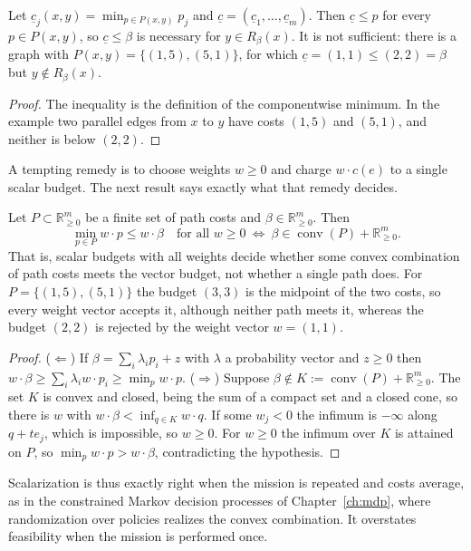 \begin{newresult}\label{prop:joint}
Let $\underline c_j(x,y)=\min_{p\in P(x,y)}p_j$ and $\underline c=(\underline c_1,\dots,\underline c_m)$. Then $\underline c\le p$ for every $p\in P(x,y)$, so $\underline c\le\beta$ is necessary for $y\in R_\beta(x)$. It is not sufficient: there is a graph with $P(x,y)=\{(1,5),(5,1)\}$, for which $\underline c=(1,1)\le(2,2)=\beta$ but $y\notin R_\beta(x)$.
\end{newresult}
\begin{proof}
The inequality is the definition of the componentwise minimum. In the example two parallel edges from $x$ to $y$ have costs $(1,5)$ and $(5,1)$, and neither is below $(2,2)$.
\end{proof}

A tempting remedy is to choose weights $w\ge0$ and charge $w\cdot c(e)$ to a single scalar budget. The next result says exactly what that remedy decides.

\begin{newresult}\label{prop:scalarization}
Let $P\subset\mathbb R^m_{\ge0}$ be a finite set of path costs and $\beta\in\mathbb R^m_{\ge0}$. Then
\[
\min_{p\in P}w\cdot p\le w\cdot\beta\quad\text{for all }w\ge0
\ \Longleftrightarrow\ 
\beta\in\operatorname{conv}(P)+\mathbb R^m_{\ge0}.
\]
That is, scalar budgets with all weights decide whether some convex combination of path costs meets the vector budget, not whether a single path does. For $P=\{(1,5),(5,1)\}$ the budget $(3,3)$ is the midpoint of the two costs, so every weight vector accepts it, although neither path meets it, whereas the budget $(2,2)$ is rejected by the weight vector $w=(1,1)$.
\end{newresult}
\begin{proof}
($\Leftarrow$) If $\beta=\sum_i\lambda_ip_i+z$ with $\lambda$ a probability vector and $z\ge0$ then $w\cdot\beta\ge\sum_i\lambda_iw\cdot p_i\ge\min_pw\cdot p$. ($\Rightarrow$) Suppose $\beta\notin K:=\operatorname{conv}(P)+\mathbb R^m_{\ge0}$. The set $K$ is convex and closed, being the sum of a compact set and a closed cone, so there is $w$ with $w\cdot\beta<\inf_{q\in K}w\cdot q$. If some $w_j<0$ the infimum is $-\infty$ along $q+te_j$, which is impossible, so $w\ge0$. For $w\ge0$ the infimum over $K$ is attained on $P$, so $\min_pw\cdot p>w\cdot\beta$, contradicting the hypothesis.
\end{proof}
Scalarization is thus exactly right when the mission is repeated and costs average, as in the constrained Markov decision processes of Chapter~\ref{ch:mdp}, where randomization over policies realizes the convex combination. It overstates feasibility when the mission is performed once.

